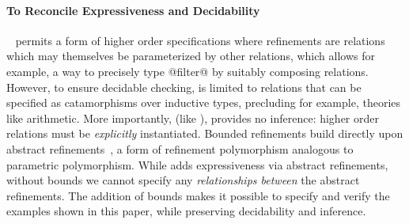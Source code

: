
\paragraph{To Reconcile Expressiveness and Decidability}
%
\catalyst~\citep{catalyst} permits a form of
higher order specifications where refinements
are relations which may themselves be parameterized
by other relations, which allows for example, a
way to precisely type @filter@ by suitably
composing relations.
%
However, to ensure decidable checking, \catalyst
is limited to relations that can be specified as
catamorphisms over inductive types, precluding
for example, theories like arithmetic.
More importantly, (like \fstar), \catalyst provides
no inference: higher order relations must be
\emph{explicitly} instantiated.
%
Bounded refinements build directly upon
abstract refinements~\citep{vazou13},
a form of refinement polymorphism
analogous to parametric polymorphism.
%
While \cite{vazou13} adds expressiveness via
abstract refinements, without bounds we cannot
specify any \emph{relationships between} the
abstract refinements. The addition of bounds
makes it possible to specify and verify the examples
shown in this paper,
while preserving decidability and inference.

